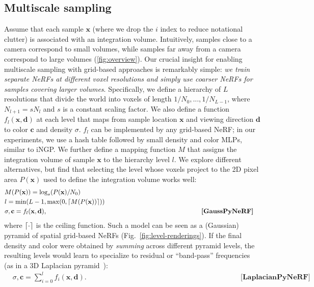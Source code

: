 \documentclass{article}
\DeclarePairedDelimiter{\ceil}{\lceil}{\rceil}
\begin{document}
\subsection{Multiscale sampling}
\label{sec:multiscale-sampling}
Assume that each sample $\mathbf{x}$ (where we drop the $i$ index to reduce notational clutter) is associated with an integration volume.
Intuitively, samples close to a camera correspond to small volumes, while samples far away from a camera correspond to large volumes (\cref{fig:overview}).
Our crucial insight for enabling multiscale sampling with grid-based approaches is remarkably simple: \emph{we train separate NeRFs at different voxel resolutions and simply use coarser NeRFs for samples covering larger volumes}.
Specifically, we define a hierarchy of $L$ resolutions that divide the world into voxels of length $1/N_0, ..., 1/N_{L-1}$, where $N_{l+1} = sN_l$ and $s$ is a constant scaling factor.
We also define a function $f_l(\mathbf{x}, \mathbf{d})$ at each level that maps from sample location $\mathbf{x}$ and viewing direction $\mathbf{d}$ to color $\mathbf{c}$ and density $\sigma$.
$f_l$ can be implemented by any grid-based NeRF; in our experiments, we use a hash table followed by small density and color MLPs, similar to iNGP.
We further define a mapping function $M$ that assigns the integration volume of sample $\mathbf{x}$ to the hierarchy level $l$.
We explore different alternatives, but find that selecting the level whose voxels project to the 2D pixel area $P(\mathbf{x})$ used to define the integration volume works well: 
\begin{align}
& M(P(\mathbf{x})) = \log_s(P({\bf x})/N_0) \label{eq:mapping-func} \\
& l = \min(L-1, \max(0, \ceil{M(P(\mathbf{x}))})) \label{eq:get-l} \\
& \sigma, \mathbf{c} = f_l(\mathbf{x}, \mathbf{d}) \text{,} \quad\quad\quad\quad\quad\quad\quad\quad\quad\quad\quad\quad\quad\quad\quad\quad\quad\quad\quad\quad\quad\quad\quad && \textbf{[GaussPyNeRF]}
\label{eq:gauss-eq}
\end{align}
where $\ceil{\cdot}$ is the ceiling function.  Such a model can be seen as a (Gaussian) pyramid of spatial grid-based NeRFs (Fig.~\ref{fig:level-renderings}). If the final density and color were obtained by {\em summing} across different pyramid levels, the resulting levels would learn to specialize to residual or ``band-pass” frequencies (as in a 3D Laplacian pyramid~\cite{laplacian}):
\begin{align}
      & \sigma, \mathbf{c} = \sum_{i=0}^{l} f_i(\mathbf{x,d}). \quad\quad\quad\quad\quad\quad\quad\quad\quad\quad\quad\quad\quad\quad\quad\quad\quad\quad\quad\quad && \textbf{[LaplacianPyNeRF]} \label{eq:residual}
\end{align}
\end{document}
